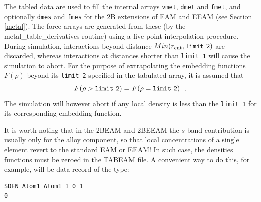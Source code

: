 The tabled data are used to fill the internal arrays {\tt vmet},
{\tt dmet} and {\tt fmet}, and optionally {\tt dmes} and {\tt fmes}
for the 2B extensions of EAM and EEAM (see Section \ref{metal}).
The force arrays are generated from these (by the
{\sc metal\_table\_derivatives} routine) using a five point
interpolation procedure.  During simulation, interactions beyond
distance $Min(r_{\rm cut},{\tt limit~2})$ are discarded, whereas
interactions at distances shorter than {\tt limit~1} will cause
the simulation to abort.  For the purpose of extrapolating the
embedding functions $F(\rho)$ beyond its {\tt limit~2} specified
in the tabulated array, it is assumed that
\begin{equation}
F(\rho > {\tt limit~2}) = F(\rho = {\tt limit~2})~~.
\end{equation}
The simulation will however abort if any local density is less
than the {\tt limit~1} for its corresponding embedding function.

It is worth noting that in the 2BEAM and 2BEEAM the $s$-band contribution
is usually only for the alloy component, so that local concentrations of
a single element revert to the standard EAM or EEAM!  In such case, the
densities functions must be zeroed in the \D TABEAM file.  A convenient
way to do this, for example, will be data record of the type:
\begin{verbatim}
SDEN Atom1 Atom1 1 0 1
0
\end{verbatim}
